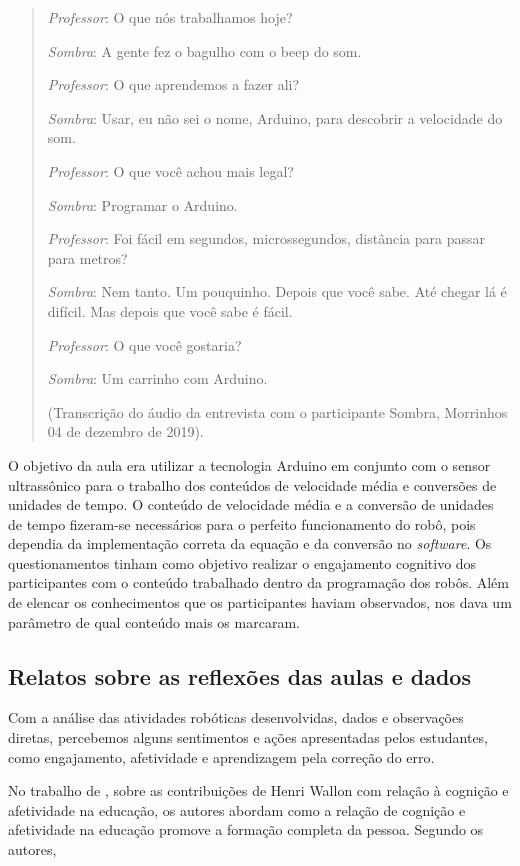 \documentclass{textolivre}
\begin{document}
\begin{quote}
\emph{Professor}: O que nós trabalhamos hoje?

\emph{Sombra}: A gente fez o bagulho com o beep do som.

\emph{Professor}: O que aprendemos a fazer ali?

\emph{Sombra}: Usar, eu não sei o nome, Arduino, para descobrir a velocidade do som.

\emph{Professor}: O que você achou mais legal?

\emph{Sombra}: Programar o Arduino.

\emph{Professor}: Foi fácil em segundos, microssegundos, distância para passar para metros?

\emph{Sombra}: Nem tanto. Um pouquinho. Depois que você sabe. Até chegar lá é difícil. Mas depois que você sabe é fácil.

\emph{Professor}: O que você gostaria?

\emph{Sombra}: Um carrinho com Arduino.

(Transcrição do áudio da entrevista com o participante Sombra, Morrinhos 04 de dezembro de 2019).
\end{quote}

O objetivo da aula era utilizar a tecnologia Arduino em conjunto com o sensor ultrassônico para o trabalho dos conteúdos de velocidade média e conversões de unidades de tempo. O conteúdo de velocidade média e a conversão de unidades de tempo fizeram-se necessários para o perfeito funcionamento do robô, pois dependia da implementação correta da equação e da conversão no \emph{software}. Os questionamentos tinham como objetivo realizar o engajamento cognitivo dos participantes com o conteúdo trabalhado dentro da programação dos robôs. Além de elencar os conhecimentos que os participantes haviam observados, nos dava um parâmetro de qual conteúdo mais os marcaram.

\subsection{Relatos sobre as reflexões das aulas e dados}
Com a análise das atividades robóticas desenvolvidas, dados e observações diretas, percebemos alguns sentimentos e ações apresentadas pelos estudantes, como engajamento, afetividade e aprendizagem pela correção do erro.

No trabalho de \textcite{ferreira2010}, sobre as contribuições de Henri Wallon com relação à cognição e afetividade na educação, os autores abordam como a relação de cognição e afetividade na educação promove a formação completa da pessoa. Segundo os autores,
\end{document}
